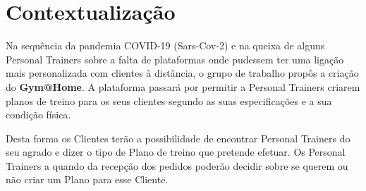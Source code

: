 \chapter{Contextualização}
\label{chap:contextualizacao}

\hspace{5mm} Na sequência da pandemia COVID-19 (Sars-Cov-2) e na queixa de alguns Personal Trainers sobre a falta de plataformas onde pudessem ter uma ligação mais personalizada com clientes à distância, o grupo de trabalho propôs a criação do \textbf{Gym@Home}. A plataforma passará por permitir a Personal Trainers criarem planos de treino para os seus clientes segundo as suas especificações e a sua condição física.

\hspace{5mm} Desta forma os Clientes terão a possibilidade de encontrar Personal Trainers do seu agrado e dizer o tipo de Plano de treino que pretende efetuar. Os Personal Trainers a quando da recepção dos pedidos poderão decidir sobre se querem ou não criar um Plano para esse Cliente.